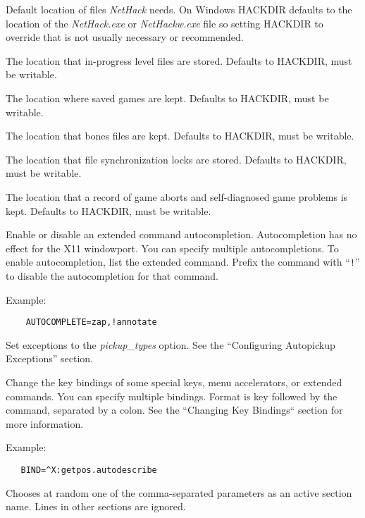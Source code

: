 \item[\bb{HACKDIR}]
Default location of files {\it NetHack\/} needs. On Windows HACKDIR
defaults to the location of the {\it NetHack.exe\/} or {\it NetHackw.exe\/} file
so setting HACKDIR to override that is not usually necessary or recommended.
\item[\bb{LEVELDIR}]
The location that in-progress level files are stored. Defaults to HACKDIR,
must be writable.
\item[\bb{SAVEDIR}]
The location where saved games are kept. Defaults to HACKDIR, must be
writable.
\item[\bb{BONESDIR}]
The location that bones files are kept. Defaults to HACKDIR, must be
writable.
\item[\bb{LOCKDIR}]
The location that file synchronization locks are stored. Defaults to
HACKDIR, must be writable.
\item[\bb{TROUBLEDIR}]
The location that a record of game aborts and self-diagnosed game problems
is kept. Defaults to HACKDIR, must be writable.
\item[\bb{AUTOCOMPLETE}]
Enable or disable an extended command autocompletion.
Autocompletion has no effect for the X11 windowport.
You can specify multiple autocompletions. To enable
autocompletion, list the extended command. Prefix the
command with ``{{\tt !}}'' to disable the autocompletion
for that command.

Example:
\begin{verbatim}
    AUTOCOMPLETE=zap,!annotate
\end{verbatim}

\item[\bb{AUTOPICKUP\_EXCEPTION}]
Set exceptions to the {{\it pickup\_types\/}}
option. See the ``Configuring Autopickup Exceptions'' section.
\item[\bb{BINDINGS}]
Change the key bindings of some special keys, menu accelerators, or
extended commands. You can specify multiple bindings. Format is key
followed by the command, separated by a colon.
See the ``Changing Key Bindings`` section for more information.

Example:
\begin{verbatim}
   BIND=^X:getpos.autodescribe
\end{verbatim}

\item[\bb{CHOOSE}]
Chooses at random one of the comma-separated parameters as an active
section name. Lines in other sections are ignored.

